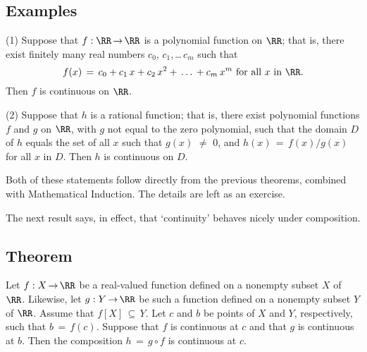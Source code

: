             \subsection{\small{\bf Examples}}
            \label{ExampD20.65}

\V

\hspace*{\parindent}(1) Suppose that $f:{\RR} \,{\rightarrow}\, {\RR}$ is a polynomial function on ${\RR}$;
    that is, there exist finitely many real numbers $c_{0}$, $c_{1}$,\,{\ldots}\,$c_{m}$ such that
        \begin{displaymath}
        f(x) \,=\, c_{0} + c_{1}\,x + c_{2}\,x^{2} + \,{\ldots}\,+c_{m}\,x^{m} \mbox{ for all $x$ in ${\RR}$}.
        \end{displaymath}
     Then $f$ is continuous on ${\RR}$.

\V

        (2) Suppose that $h$ is a rational function; that is, there exist polynomial functions $f$ and $g$ on ${\RR}$, with $g$ not equal to the zero polynomial, such that the domain $D$ of $h$ equals the set of all $x$ such that $g(x) \,\,{\neq}\,\, 0$, and $h(x) \,=\, f(x)/g(x)$ for all $x$ in $D$.
    Then $h$ is continuous on $D$.

\V

        Both of these statements follow directly from the previous theorems, combined with Mathematical Induction. The details are left as an exercise.

\VV

        The next result says, in effect, that `continuity' behaves nicely under composition.

\V

            \subsection{\small{\bf Theorem}}
            \label{ThmD20.70}

        Let $f:X \,{\rightarrow}\, {\RR}$ be a real-valued function defined on a nonempty subset $X$ of ${\RR}$.
    Likewise, let $g:Y \,{\rightarrow}\, {\RR}$ be such a function defined on a nonempty subset $Y$ of ${\RR}$. Assume that $f[X] \,{\subseteq}\, Y$.
    Let $c$ and $b$ be points of $X$ and $Y$, respectively, such that $b \,=\, f(c)$. Suppose that $f$ is continuous at $c$ and that $g$ is continuous at $b$.
    Then the composition $h \,=\, g{\circ}f$ is continuous at $c$.

\V

